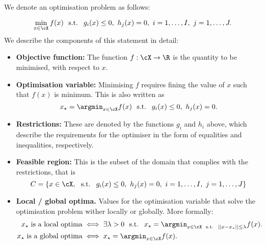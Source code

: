 We denote an optimisation problem as follows: 

\begin{equation}
	\min_{x\in\cX} f(x) \text{~ s.t.~ } g_i(x)\leq 0,~  h_j(x) = 0,~ i=1,\ldots,I,~ j=1,\ldots,J.
\end{equation}
We describe the components of this statement in detail: 

\begin{itemize}
	\item \textbf{Objective function:} The function $f:\cX\to \R$ is the quantity to be minimised, with respect to $x$. 
	\item \textbf{Optimisation variable:} Minimising $f$ requires fining the value of $x$ such that $f(x)$ is minimum. This is also written as
	\begin{equation}
	x_\star = \argmin_{x\in\cX} f(x) \text{~ s.t.~ } g_i(x)\leq 0,~  h_j(x) = 0.
	\end{equation}
	\item \textbf{Restrictions:} These are denoted by the functions $g_i$ and $h_i$ above, which describe the requirements for the optimiser in the form of equalities and inequalities, respectively. 
	\item \textbf{Feasible region:}  This is the subset of the domain that complies with the restrictions, that is 
	\begin{equation}
		C = \{x\in\cX, \text{~ s.t.~ } g_i(x)\leq 0,~  h_j(x) = 0,~ i=1,\ldots,I,~ j=1,\ldots,J \}
	\end{equation}
	\item \textbf{Local / global optima.} Values for the optimisation variable that solve the optimisation problem wither locally or globally. More formally: 
	\begin{align}
		\text{$x_\star$ is a local optima} &\iff \exists \lambda>0 \text{~ s.t.~ }  x_\star = \argmin_{ x\in\cX \text{~ s.t.~ } ||x-x_\star||\leq \lambda } f(x). \\
		\text{$x_\star$ is a global optima} &\iff x_\star = \argmin_{ x\in\cX } f(x). 
	\end{align}
\end{itemize}

\begin{mdframed}[style=discusion, frametitle={\center Interplay between constrains and local/global optima}]

\end{mdframed}


